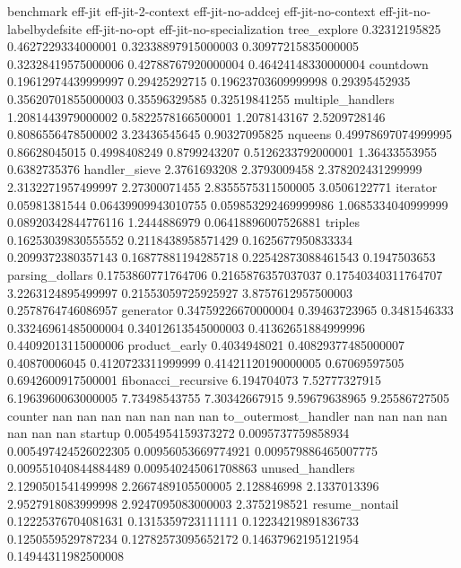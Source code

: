 benchmark	eff-jit	eff-jit-2-context	eff-jit-no-addcej	eff-jit-no-context	eff-jit-no-labelbydefsite	eff-jit-no-opt	eff-jit-no-specialization
tree_explore	0.32312195825	0.4627229334000001	0.32338897915000003	0.30977215835000005	0.32328419575000006	0.42788767920000004	0.46424148330000004
countdown	0.19612974439999997	0.29425292715	0.19623703609999998	0.29395452935	0.35620701855000003	0.35596329585	0.32519841255
multiple_handlers	1.2081443979000002	0.5822578166500001	1.2078143167	2.5209728146	0.8086556478500002	3.23436545645	0.90327095825
nqueens	0.49978697074999995	0.86628045015	0.4998408249	0.8799243207	0.5126233792000001	1.36433553955	0.6382735376
handler_sieve	2.3761693208	2.3793009458	2.378202431299999	2.3132271957499997	2.27300071455	2.8355575311500005	3.0506122771
iterator	0.05981381544	0.06439909943010755	0.059853292469999986	1.0685334040999999	0.08920342844776116	1.2444886979	0.06418896007526881
triples	0.16253039830555552	0.2118438958571429	0.1625677950833334	0.2099372380357143	0.16877881194285718	0.22542873088461543	0.1947503653
parsing_dollars	0.1753860771764706	0.2165876357037037	0.17540340311764707	3.2263124895499997	0.21553059725925927	3.8757612957500003	0.2578764746086957
generator	0.34759226670000004	0.39463723965	0.3481546333	0.33246961485000004	0.34012613545000003	0.41362651884999996	0.44092013115000006
product_early	0.4034948021	0.40829377485000007	0.40870006045	0.4120723311999999	0.41421120190000005	0.67069597505	0.6942600917500001
fibonacci_recursive	6.194704073	7.52777327915	6.1963960063000005	7.73498543755	7.30342667915	9.59679638965	9.25586727505
counter	nan	nan	nan	nan	nan	nan	nan
to_outermost_handler	nan	nan	nan	nan	nan	nan	nan
startup	0.0054954159373272	0.0095737759858934	0.005497424526022305	0.00956053669774921	0.009579886465007775	0.009551040844884489	0.009540245061708863
unused_handlers	2.1290501541499998	2.2667489105500005	2.128846998	2.1337013396	2.9527918083999998	2.9247095083000003	2.3752198521
resume_nontail	0.12225376704081631	0.1315359723111111	0.12234219891836733	0.1250559529787234	0.12782573095652172	0.14637962195121954	0.14944311982500008